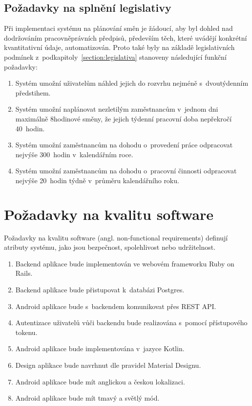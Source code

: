 \documentclass[twoside]{ctuthesis}
\begin{document}
\subsection{Požadavky na splnění legislativy}
Při implementaci systému na plánování směn je žádoucí, aby byl dohled nad dodržováním pracovněprávních předpisů, především těch, které uvádějí konkrétní kvantitativní údaje, automatizován. Proto také byly na základě legislativních podmínek z~podkapitoly~\ref{section:legislativa} stanoveny následující funkční požadavky:

\begin{enumerate}[label=\textbf{L\arabic*.}]
	\item Systém umožní uživatelům náhled jejich do rozvrhu nejméně s~dvou\-tý\-den\-ním předstihem.
	\item Systém umožní naplánovat nezletilým zaměstnancům v~jednom dni maximálně 8hodinové směny, že jejich týdenní pracovní doba nepřekročí 40~hodin.
	\item Systém umožní zaměstnancům na dohodu o~provedení práce odpracovat nejvýše 300~hodin v~kalendářním roce.
	\item Systém umožní zaměstnancům na dohodu o~pracovní činnosti odpracovat nejvýše 20~hodin týdně v~průměru kalendářního roku.
\end{enumerate}

\section{Požadavky na kvalitu software}
Požadavky na kvalitu software (angl. non-functional requirements) definují atributy systému, jako jsou bezpečnost, spolehlivost nebo udržitelnost.

\begin{enumerate}[label=\textbf{N\arabic*.}]
	\item Backend aplikace bude implementován ve webovém frameworku Ruby on Rails.
	\item Backend aplikace bude přistupovat k~databázi Postgres.
	\item Android aplikace bude s~backendem komunikovat přes REST API.
	\item Autentizace uživatelů vůči backendu bude realizována s~pomocí přís\-tu\-po\-vé\-ho tokenu.
	\item Android aplikace bude implementována v~jazyce Kotlin.
	\item Design aplikace bude navrhnut dle pravidel Material Designu.
	\item Android aplikace bude mít anglickou a českou lokalizaci.
	\item Android aplikace bude mít tmavý a světlý mód.
\end{enumerate}
\newpage
\end{document}
